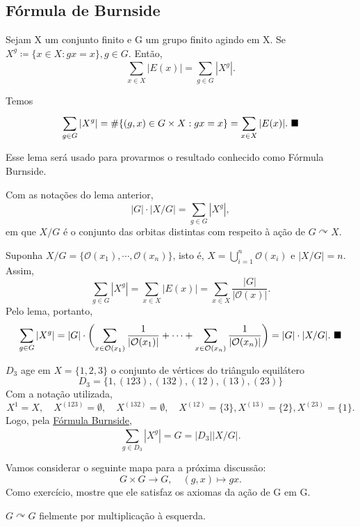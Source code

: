 \documentclass[Algebra/algebra_notes.tex]{subfiles}
\begin{document}
\subsection{Fórmula de Burnside}
\begin{lemma*}
	Sejam X um conjunto finito e G um grupo finito agindo em X. Se \(X^{g}\coloneqq \{x\in X: gx=x\}, g\in G\).
	Então,
	\[
		\sum\limits_{x\in X}^{}|E(x)| = \sum\limits_{g\in G}^{}|X^{g}|.
	\]
\end{lemma*}
\begin{proof*}
	Temos
	\[
		\sum\limits_{g\in G}^{}|X^{g}| = \#\{(g, x)\in G\times X: gx=x\} = \sum\limits_{x\in X}^{}|E(x)|.\text{ $\blacksquare$}
	\]
\end{proof*}
Esse lema será usado para provarmos o resultado conhecido como Fórmula Burnside.
\hypertarget{burnside}{
	\begin{prop*}
		Com as notações do lema anterior,
		\[
			|G|\cdot |X/G| = \sum\limits_{g\in G}^{}|X^{g}|,
		\]
		em que \(X/G\) é o conjunto das orbitas distintas com respeito à ação de \(G \curvearrowright X\).
	\end{prop*}
}
\begin{proof*}
	Suponha \(X/G=\{\mathcal{O}(x_{1}), \cdots, \mathcal{O}(x_{n})\}\), isto é, \(X=\bigcup_{i=1}^{n}{\mathcal{O}(x_{i})}\)
	e \(|X/G| = n\). Assim,
	\[
		\sum\limits_{g\in G}^{}|X^{g}| = \sum\limits_{x\in X}^{}|E(x)| = \sum\limits_{x\in X}^{}\frac{|G|}{|\mathcal{O}(x)|}.
	\]
	Pelo lema, portanto,
	\[
		\sum\limits_{g\in G}^{}|X^{g}| = |G|\cdot \biggl(\sum\limits_{x\in \mathcal{O}(x_{1})}^{}\frac{1}{|\mathcal{O}(x_{1})|} + \cdots + \sum\limits_{x\in \mathcal{O}(x_{n})}^{}\frac{1}{|\mathcal{O}(x_{n})|}\biggr) = |G|\cdot |X/G|.\text{ $\blacksquare$}
	\]
\end{proof*}
\begin{example*}
	\(D_{3}\) age em \(X=\{1, 2, 3\}\) o conjunto de vértices do triângulo equilátero
	\[
		D_{3} = \{1, (123), (132), (12), (13), (23)\}
	\]
	Com a notação utilizada,
	\[
		X^{1} = X,\quad X^{(123)}=\emptyset,\quad X^{(132)}=\emptyset,\quad X^{(12)}=\{3\}, X^{(13)}=\{2\}, X^{(23)}=\{1\}.
	\]
	Logo, pela \hyperlink{burnside}{Fórmula Burnside},
	\[
		\sum\limits_{g\in D_{3}}^{}|X^{g}| = G = |D_{3}||X/G|.
	\]
\end{example*}
Vamos considerar o seguinte mapa para a próxima discussão:
\[
	G\times{G}\rightarrow G,\quad (g, x)\mapsto gx.
\]
Como exercício, mostre que ele satisfaz os axiomas da ação de G em G.
\begin{lemma*}
	\(G \curvearrowright G\) fielmente por multiplicação à esquerda.
\end{lemma*}
\end{document}
